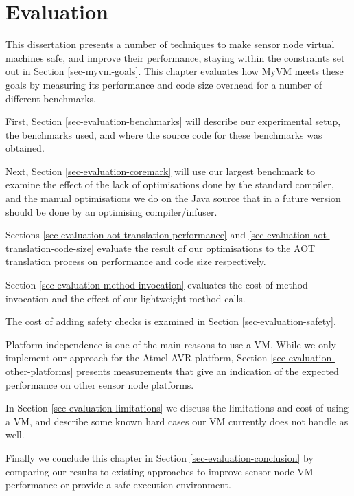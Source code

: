 \chapter{Evaluation}
\label{sec-evaluation}

This dissertation presents a number of techniques to make sensor node virtual machines safe, and improve their performance, staying within the constraints set out in Section \ref{sec-myvm-goals}. This chapter evaluates how MyVM meets these goals by measuring its performance and code size overhead for a number of different benchmarks.

First, Section \ref{sec-evaluation-benchmarks} will describe our experimental setup, the benchmarks used, and where the source code for these benchmarks was obtained.

Next, Section \ref{sec-evaluation-coremark} will use our largest benchmark to examine the effect of the lack of optimisations done by the standard  compiler, and the manual optimisations we do on the Java source that in a future version should be done by an optimising compiler/infuser.

Sections \ref{sec-evaluation-aot-translation-performance} and \ref{sec-evaluation-aot-translation-code-size} evaluate the result of our optimisations to the AOT translation process on performance and code size respectively.

Section \ref{sec-evaluation-method-invocation} evaluates the cost of method invocation and the effect of our lightweight method calls.

The cost of adding safety checks is examined in Section \ref{sec-evaluation-safety}.

Platform independence is one of the main reasons to use a VM. While we only implement our approach for the Atmel AVR platform, Section \ref{sec-evaluation-other-platforms} presents measurements that give an indication of the expected performance on other sensor node platforms.

In Section \ref{sec-evaluation-limitations} we discuss the limitations and cost of using a VM, and describe some known hard cases our VM currently does not handle as well.

Finally we conclude this chapter in Section \ref{sec-evaluation-conclusion} by comparing our results to existing approaches to improve sensor node VM performance or provide a safe execution environment.



